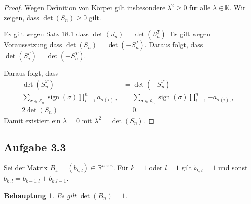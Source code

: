 \documentclass[draft,a5paper]{article}
\newtheorem*{beh}{Behauptung}
\DeclareMathOperator{\sign}{sign}
\begin{document}
\begin{proof}
  Wegen Definition von Körper gilt insbesondere \(\lambda^{2} \ge 0\) für alle
  \(\lambda \in \mathbb{K}\).  Wir zeigen, dass \(\det(S_{n}) \ge 0\) gilt.

  Es gilt wegen Satz 18.1 dass \(\det(S_{n}) = \det(S_{n}^{T})\).  Es
  gilt wegen Voraussetzung dass \(\det(S_{n}) = \det(-S_{n}^{T})\).
  Daraus folgt, dass \(\det(S_{n}^{T})  = \det(-S_{n}^{T})\).

  Daraus folgt, dass
  \begin{align*}
    \det(S_{n}^{T})  &= \det(-S_{n}^{T}) \\
    \sum_{\sigma \in \mathcal{S}_{n} }{\sign(\sigma) \prod_{i = 1}^{n}{a_{\sigma(i), i}}}
                     &=  \sum_{\sigma \in \mathcal{S}_{n} }{\sign(\sigma) \prod_{i =
                       1}^{n}{-a_{\sigma(i), i}}} \\
    2 \det(S_{n}) &= 0.
  \end{align*}
  Damit existiert ein \(\lambda = 0\) mit \(\lambda^{2} = \det(S_{n})\).
\end{proof}

\subsection*{Aufgabe 3.3}

Sei der Matrix \(B_{n} = (b_{k, l}) \in \mathbb{R}^{n \times n}\).  Für
\(k = 1\) oder \(l = 1\) gilt \(b_{k, l} = 1\) und sonst
\(b_{k, l} = b_{k-1, l} + b_{k, l - 1}\).

\begin{beh}
  Es gilt \(\det(B_{n}) = 1\).
\end{beh}
\end{document}
